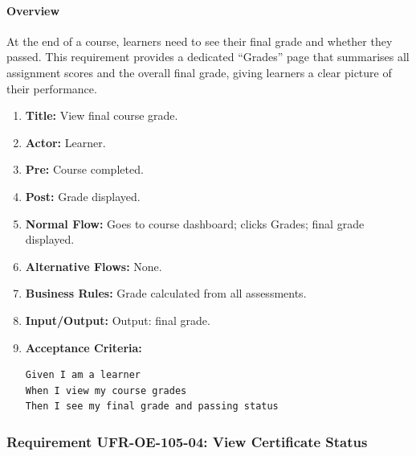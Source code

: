 \paragraph{Overview}
At the end of a course, learners need to see their final grade and whether they passed. This requirement provides a dedicated “Grades” page that summarises all assignment scores and the overall final grade, giving learners a clear picture of their performance.
\begin{enumerate}[label=\textbf{\arabic*.}]
\item \textbf{Title:} View final course grade.
\item \textbf{Actor:} Learner.
\item \textbf{Pre:} Course completed.
\item \textbf{Post:} Grade displayed.
\item \textbf{Normal Flow:} Goes to course dashboard; clicks Grades; final grade displayed.
\item \textbf{Alternative Flows:} None.
\item \textbf{Business Rules:} Grade calculated from all assessments.
\item \textbf{Input/Output:} Output: final grade.
\item \textbf{Acceptance Criteria:}
    \begin{verbatim}
Given I am a learner
When I view my course grades
Then I see my final grade and passing status
    \end{verbatim}
\end{enumerate}

\subsubsection{Requirement UFR-OE-105-04: View Certificate Status}
